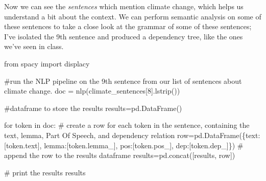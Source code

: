 \documentclass[
  letterpaper,
  DIV=11,
  numbers=noendperiod]{scrreprt}
\newenvironment{Shaded}{\begin{snugshade}}{\end{snugshade}}
\newcommand{\CommentTok}[1]{\textcolor[rgb]{0.37,0.37,0.37}{#1}}
\newcommand{\ControlFlowTok}[1]{\textcolor[rgb]{0.00,0.23,0.31}{#1}}
\newcommand{\DecValTok}[1]{\textcolor[rgb]{0.68,0.00,0.00}{#1}}
\newcommand{\ImportTok}[1]{\textcolor[rgb]{0.00,0.46,0.62}{#1}}
\newcommand{\KeywordTok}[1]{\textcolor[rgb]{0.00,0.23,0.31}{#1}}
\newcommand{\NormalTok}[1]{\textcolor[rgb]{0.00,0.23,0.31}{#1}}
\newcommand{\OperatorTok}[1]{\textcolor[rgb]{0.37,0.37,0.37}{#1}}
\newcommand{\StringTok}[1]{\textcolor[rgb]{0.13,0.47,0.30}{#1}}
\begin{document}
Now we can see the \emph{sentences} which mention climate change, which
helps us understand a bit about the context. We can perform semantic
analysis on some of these sentences to take a close look at the grammar
of some of these sentences; I've isolated the 9th sentence and produced
a dependency tree, like the ones we've seen in class.

\begin{Shaded}
\begin{Highlighting}[]
\ImportTok{from}\NormalTok{ spacy }\ImportTok{import}\NormalTok{ displacy}

\CommentTok{\#run the NLP pipeline on the 9th sentence from our list of sentences about climate change.}
\NormalTok{doc }\OperatorTok{=}\NormalTok{ nlp(climate\_sentences[}\DecValTok{8}\NormalTok{].lstrip())}

\CommentTok{\#dataframe to store the results}
\NormalTok{results}\OperatorTok{=}\NormalTok{pd.DataFrame()}

\ControlFlowTok{for}\NormalTok{ token }\KeywordTok{in}\NormalTok{ doc:}
    \CommentTok{\# create a row for each token in the sentence, containing the text, lemma, Part Of Speech, and dependency relation}
\NormalTok{    row}\OperatorTok{=}\NormalTok{pd.DataFrame(\{}\StringTok{\textquotesingle{}text\textquotesingle{}}\NormalTok{:[token.text], }\StringTok{\textquotesingle{}lemma\textquotesingle{}}\NormalTok{:[token.lemma\_], }\StringTok{\textquotesingle{}pos\textquotesingle{}}\NormalTok{:[token.pos\_], }\StringTok{\textquotesingle{}dep\textquotesingle{}}\NormalTok{:[token.dep\_]\})}
    \CommentTok{\# append the row to the results dataframe}
\NormalTok{    results}\OperatorTok{=}\NormalTok{pd.concat([results, row])}

\CommentTok{\# print the results}
\NormalTok{results}
\end{Highlighting}
\end{Shaded}
\end{document}
